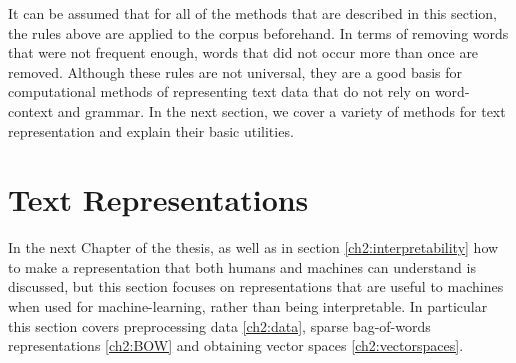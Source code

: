 It can be assumed that for all of the methods that are described in this section, the  rules above are applied to the corpus beforehand. In terms of removing words that were not frequent enough, words that did not occur more than once are removed.  Although these rules are not universal, they are a good basis for computational methods of representing text data that do not rely on word-context and grammar. In the next section, we cover a variety of methods for text representation and explain their basic utilities.  %

\section{Text Representations}\label{ch2:representations}




In the next Chapter of the thesis, as well as in section \ref{ch2:interpretability} how to make a representation that both humans and machines can understand is discussed, but this section  focuses on representations that are useful to machines when used for machine-learning, rather than being interpretable. In particular this section covers preprocessing data \ref{ch2:data}, sparse bag-of-words representations \ref{ch2:BOW} and obtaining vector spaces \ref{ch2:vectorspaces}.










